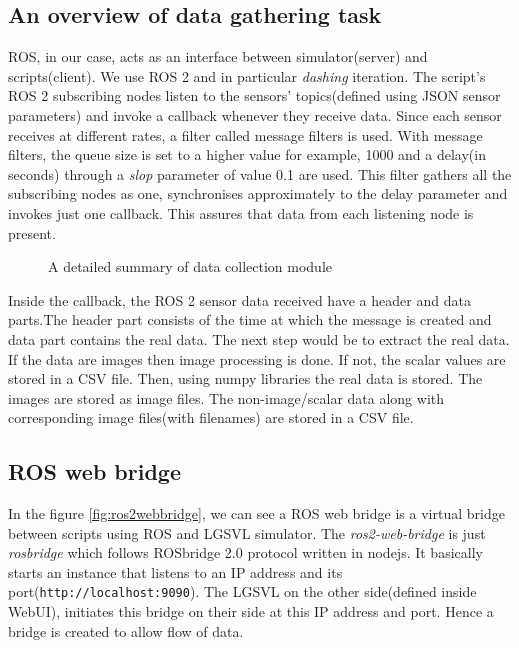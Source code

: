 \subsection{An overview of data gathering task}
ROS, in our case, acts as an interface between simulator(server) and scripts(client).
We use ROS 2 and in particular \textit{dashing} iteration.
The script's ROS 2 subscribing nodes listen to the sensors' topics(defined using JSON
sensor parameters) and invoke a callback whenever they receive data. Since each sensor receives at different rates, a
filter called message filters is used. With message filters, the queue size is set to a
higher value for example, 1000 and a delay(in seconds) through a \textit{slop} parameter of value
0.1 are used. This filter gathers all the subscribing nodes as one, synchronises
approximately to the delay parameter and invokes just one callback. This assures that data
from each listening node is present.
\begin{figure}
	\centering
    \def\svgwidth{\textwidth}
    \caption{A detailed summary of data collection module}
    \label{fig:datacollectionmodule}
\end{figure}

Inside the callback, the ROS 2 sensor data received have a header and data parts.The header part consists of the time at which the message is created and data part
contains the real data. The next step would be to extract the real data. If the data are images then image processing is
done. If not, the scalar values are stored in a CSV file. Then, using numpy libraries the
real data is stored. The images are stored as image files. The non-image/scalar data  along
with corresponding image files(with filenames) are
stored in a CSV file.

\subsection{ROS web bridge}
In the figure \ref{fig:ros2webbridge}, we can see a ROS web bridge is a virtual bridge between
scripts using ROS and LGSVL simulator.
The \textit{ros2-web-bridge} is just \textit{rosbridge} which follows ROSbridge 2.0 protocol
written in nodejs. It basically starts an instance
that listens to an IP address and its port(\texttt{http://localhost:9090}). The LGSVL on the other side(defined inside
WebUI), initiates this bridge on their side at this IP address and port. Hence a bridge is created to allow flow of data.

